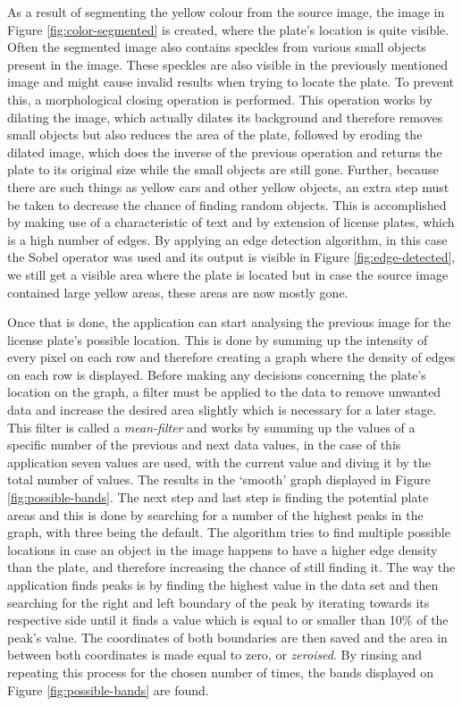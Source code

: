 As a result of segmenting the yellow colour from the source image, the image in Figure \ref{fig:color-segmented} is created, where the plate's location is quite visible. Often the segmented image also contains speckles from various small objects present in the image. These speckles are also visible in the previously mentioned image and might cause invalid results when trying to locate the plate. To prevent this, a morphological closing operation \cite{morphclose} is performed. This operation works by dilating the image, which actually dilates its background and therefore removes small objects but also reduces the area of the plate, followed by eroding the dilated image, which does the inverse of the previous operation and returns the plate to its original size while the small objects are still gone. Further, because there are such things as yellow cars and other yellow objects, an extra step must be taken to decrease the chance of finding random objects. This is accomplished by making use of a characteristic of text and by extension of license plates, which is a high number of edges. By applying an edge detection algorithm, in this case the Sobel operator \cite{sobel} was used and its output is visible in Figure \ref{fig:edge-detected}, we still get a visible area where the plate is located but in case the source image contained large yellow areas, these areas are now mostly gone.

Once that is done, the application can start analysing the previous image for the license plate's possible location. This is done by summing up the intensity of every pixel on each row and therefore creating a graph where the density of edges on each row is displayed. Before making any decisions concerning the plate's location on the graph, a filter must be applied to the data to remove unwanted data and increase the desired area slightly which is necessary for a later stage. This filter is called a \emph{mean-filter} and works by summing up the values of a specific number of the previous and next data values, in the case of this application seven values are used, with the current value and diving it by the total number of values. The results in the `smooth' graph displayed in Figure \ref{fig:possible-bands}. The next step and last step is finding the potential plate areas and this is done by searching for a number of the highest peaks in the graph, with three being the default. The algorithm tries to find multiple possible locations in case an object in the image happens to have a higher edge density than the plate, and therefore increasing the chance of still finding it. The way the application finds peaks is by finding the highest value in the data set and then searching for the right and left boundary of the peak by iterating towards its respective side until it finds a value which is equal to or smaller than 10\% of the peak's value. The coordinates of both boundaries are then saved and the area in between both coordinates is made equal to zero, or \emph{zeroised}. By rinsing and repeating this process for the chosen number of times, the bands displayed on Figure \ref{fig:possible-bands} are found. 

